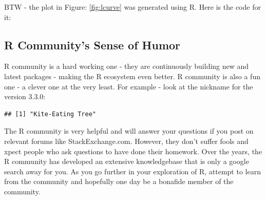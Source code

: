 \documentclass[10pt, letterpaper, twoside]{memoir}\usepackage{knitr}
\begin{document}
BTW - the plot in Figure: \ref{fig:lcurve} was generated using R. Here is the code for it:
\begin{knitrout}
\color{fgcolor}\begin{kframe}
\begin{alltt}
\hlopt{^}\hlstd{,}  \hlstd{=} \hlstd{,}  \hlstd{=} \hlstd{,}  \hlstd{=} \hlstd{,}  \hlstd{=} \hlstd{,}  \hlstd{=} \hlstd{,}
     \hlstd{=} \hlstd{,}  \hlstd{=} \hlstd{,}  \hlstd{=} \hlstd{)}
\hlstd{(} \hlstd{=} \hlstd{,}  \hlstd{=} \hlstd{,}  \hlstd{=} \hlstd{,}  \hlstd{=} \hlstd{)}
\end{alltt}
\end{kframe}
\end{knitrout}


\subsection{R Community's Sense of Humor}

R community is a hard working one - they are continuously building new and latest packages - making the R ecosystem even better. R community is also a fun one - a clever one at the very least. For example - look at the nickname for the version 3.3.0:
\begin{knitrout}
\color{fgcolor}\begin{kframe}
\begin{alltt}
\hlopt{$}
\end{alltt}
\begin{verbatim}
## [1] "Kite-Eating Tree"
\end{verbatim}
\end{kframe}
\end{knitrout}

The R community is very helpful and will answer your questions if you post on relevant forums like StackExchange.com. However, they don't suffer fools and xpect people who ask questions to have done their homework. Over the years, the R community has developed an extensive knowledgebase that is only a google search away for you. As you go further in your exploration of R, attempt to learn from the community and hopefully one day be a bonafide member of the community.
\end{document}
